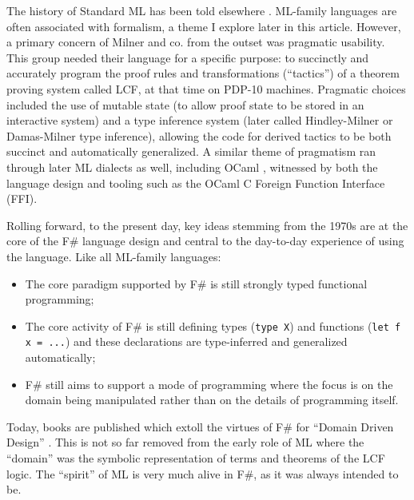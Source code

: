 \documentclass[acmsmall]{acmart}\settopmatter{}
\begin{document}
The history of Standard ML has been told elsewhere \citep{MacQueen2015}. ML-family languages are often associated with
formalism, a theme I explore later in this article. However, a primary concern of Milner and co. from the outset was pragmatic
usability. This group needed their language for a specific purpose: to succinctly and accurately program the proof rules and
transformations (``tactics'') of a theorem proving system called LCF, at that time on PDP-10 machines. Pragmatic choices
included the use of mutable state (to allow proof state to be stored in an interactive system) and a type inference
system (later called Hindley-Milner or Damas-Milner type inference), allowing the code for derived tactics to be both
succinct and automatically generalized.  A similar theme of pragmatism ran through later ML dialects as well, including
OCaml \citep{Leroy2014}, witnessed by both the language design and tooling such as the OCaml C Foreign Function Interface (FFI).

Rolling forward, to the present day, key ideas stemming from the 1970s are at the core of the F\# language design
and central to the day-to-day experience of using the language.  Like all ML-family languages:
\begin{itemize}
\item The core paradigm supported by F\# is still strongly typed functional programming;
\item The core activity of F\# is still defining types (\texttt{type X}) and functions (\texttt{let f x = ...}) and these
declarations are type-inferred and generalized automatically;
\item F\# still aims to support a mode of programming where the focus is on the domain being manipulated rather than on the details of programming itself.
\end{itemize}

Today, books are published which extoll the virtues of F\# for ``Domain Driven Design'' \citep{wlaschin2018domain}.  This is not so
far removed from the early role of ML where the ``domain'' was the symbolic representation of terms and theorems of the
LCF logic. The ``spirit'' of ML is very much alive in F\#, as it was always intended to be. 
\end{document}
